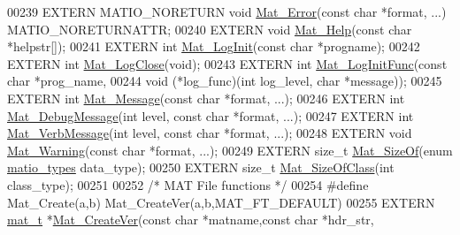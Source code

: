\begin{DoxyCode}
00239 EXTERN MATIO\_NORETURN \textcolor{keywordtype}{void} \hyperlink{group__mat__util_ga058b1cb9a4ca36712857d2b3c4de7ffc}{Mat\_Error}(\textcolor{keyword}{const} \textcolor{keywordtype}{char} *format, ...) MATIO\_NORETURNATTR;
00240 EXTERN \textcolor{keywordtype}{void}   \hyperlink{group__mat__util_gaa4039c185e807ed2e9682b66fe2ea331}{Mat\_Help}(const \textcolor{keywordtype}{char} *helpstr[]);
00241 EXTERN \textcolor{keywordtype}{int}    \hyperlink{group__mat__util_ga0d30e03216ceaab7c0a4ff878b26f89f}{Mat\_LogInit}(const \textcolor{keywordtype}{char} *progname);
00242 EXTERN \textcolor{keywordtype}{int}    \hyperlink{group__mat__util_ga333d15dbd2e7a691621a2af8fc7adc3d}{Mat\_LogClose}(\textcolor{keywordtype}{void});
00243 EXTERN \textcolor{keywordtype}{int}    \hyperlink{group__mat__util_ga93f4dd8d36413ae7f49260d757e3ab9f}{Mat\_LogInitFunc}(const \textcolor{keywordtype}{char} *prog\_name,
00244                   \textcolor{keywordtype}{void} (*log\_func)(\textcolor{keywordtype}{int} log\_level, \textcolor{keywordtype}{char} *message));
00245 EXTERN \textcolor{keywordtype}{int}    \hyperlink{group__mat__util_gae7dfa394b111bc908a616f8f5bddaa97}{Mat\_Message}(const \textcolor{keywordtype}{char} *format, ...);
00246 EXTERN \textcolor{keywordtype}{int}    \hyperlink{group__mat__util_ga26e00cfb07551be5201fd9e0f04066d9}{Mat\_DebugMessage}(\textcolor{keywordtype}{int} level, const \textcolor{keywordtype}{char} *format, ...);
00247 EXTERN \textcolor{keywordtype}{int}    \hyperlink{group__mat__util_ga64a176ea7e27e38d4242a24f3e3bad24}{Mat\_VerbMessage}(\textcolor{keywordtype}{int} level, const \textcolor{keywordtype}{char} *format, ...);
00248 EXTERN \textcolor{keywordtype}{void}   \hyperlink{group__mat__util_gafcedc83eb7e4759a8ea5c974c4f801c3}{Mat\_Warning}(const \textcolor{keywordtype}{char} *format, ...);
00249 EXTERN \textcolor{keywordtype}{size\_t} \hyperlink{group__mat__util_gab6774aabdc124c540c1e7686d0804940}{Mat\_SizeOf}(enum \hyperlink{group___m_a_t_gacf7b3b879282b7ab3a51190e49bf3453}{matio\_types} data\_type);
00250 EXTERN \textcolor{keywordtype}{size\_t} \hyperlink{group___m_a_t_ga2bf682f015b22fa796a8885e997661e7}{Mat\_SizeOfClass}(\textcolor{keywordtype}{int} class\_type);
00251 
00252 \textcolor{comment}{/* MAT File functions */}
00254 \textcolor{preprocessor}{#define            Mat\_Create(a,b) Mat\_CreateVer(a,b,MAT\_FT\_DEFAULT)}
00255 EXTERN \hyperlink{struct__mat__t}{mat\_t}      *\hyperlink{group___m_a_t_ga22d404f203af7869c841400e7ad247cf}{Mat\_CreateVer}(\textcolor{keyword}{const} \textcolor{keywordtype}{char} *matname,\textcolor{keyword}{const} \textcolor{keywordtype}{char} *hdr\_str,

\end{DoxyCode}
